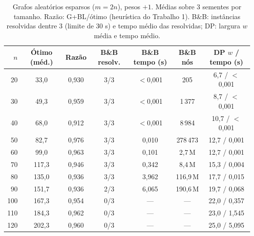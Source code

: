 \begin{table}[ht]\centering\small
\caption{Grafos aleat\'orios esparsos ($m=2n$), pesos $+1$. M\'edias sobre 3 sementes por tamanho. Raz\~ao: G+BL/\'otimo (heur\'istica do Trabalho 1). B\&B: inst\^ancias resolvidas dentre 3 (limite de 30 s) e tempo m\'edio das resolvidas; DP: largura $w$ m\'edia e tempo m\'edio.}\label{tab:ale}
\begin{tabular}{rcccccc}\hline
$n$ & \'Otimo (m\'ed.) & Raz\~ao & B\&B resolv. & B\&B tempo (s) & B\&B n\'os & DP $w$ / tempo (s) \\\hline
20 & 33{,}0 & 0{,}930 & 3/3 & $<$0{,}001 & 205 & 6{,}7 / $<$0{,}001 \\
30 & 49{,}3 & 0{,}959 & 3/3 & $<$0{,}001 & 1\,377 & 8{,}7 / $<$0{,}001 \\
40 & 68{,}0 & 0{,}912 & 3/3 & $<$0{,}001 & 8\,984 & 10{,}7 / $<$0{,}001 \\
50 & 82{,}7 & 0{,}976 & 3/3 & 0{,}010 & 278\,473 & 12{,}7 / 0{,}001 \\
60 & 99{,}0 & 0{,}963 & 3/3 & 0{,}101 & 2{,}7\,M & 12{,}7 / 0{,}001 \\
70 & 117{,}3 & 0{,}946 & 3/3 & 0{,}342 & 8{,}4\,M & 15{,}3 / 0{,}004 \\
80 & 135{,}0 & 0{,}936 & 3/3 & 3{,}962 & 116{,}9\,M & 17{,}7 / 0{,}015 \\
90 & 151{,}7 & 0{,}936 & 2/3 & 6{,}065 & 190{,}6\,M & 19{,}7 / 0{,}068 \\
100 & 167{,}3 & 0{,}954 & 0/3 & --- & --- & 22{,}0 / 0{,}357 \\
110 & 184{,}3 & 0{,}962 & 0/3 & --- & --- & 23{,}0 / 1{,}545 \\
120 & 202{,}3 & 0{,}960 & 0/3 & --- & --- & 25{,}0 / 5{,}095 \\
\hline\end{tabular}\end{table}


